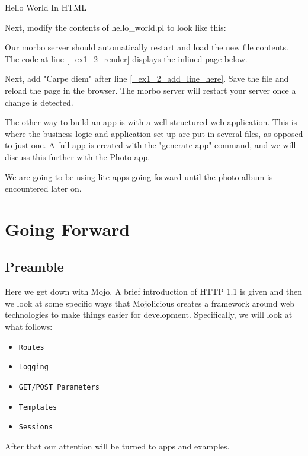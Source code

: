 \documentclass[14pt]{extreport}
\begin{document}
{\Large Hello World In HTML}

Next, modify the contents of hello\_world.pl to look like this:



Our morbo server should automatically restart and load the new file contents.
The code at line \ref{_ex1_2_render} displays the inlined page below.

Next, add "Carpe diem" after line \ref{_ex1_2_add_line_here}. Save the file and
reload the page in the browser. The morbo server will restart your server once
a change is detected.

The other way to build an app is with a well-structured web application. This
is where the business logic and application set up are put in several files, as
opposed to just one.  A full app is created with the "generate app" command,
and we will discuss this further with the Photo app.

We are going to be using lite apps going forward until the photo album is
encountered later on.

\chapter*{Going Forward}

\section{Preamble}

Here we get down with Mojo.  A brief introduction of HTTP 1.1 is given and then
we look at some specific ways that Mojolicious creates a framework around
web technologies to make things easier for development.  Specifically, we will look
at what follows:

\begin{itemize} \itemsep1pt \parskip0pt 
\item \verb|Routes|
\item \verb|Logging|
\item \verb|GET/POST Parameters|
\item \verb|Templates|
\item \verb|Sessions|
\end{itemize}

After that our attention will be turned to apps and examples.
\end{document}
